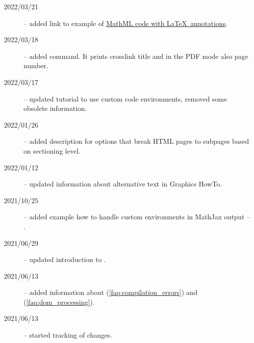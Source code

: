\begin{description}
  \item[2022/03/21] -- added link to example of \href{https://tex.stackexchange.com/a/637910/2891}{MathML code with \LaTeX\ annotations}.
  \item[2022/03/18] -- added \texcommand{\namerefpage} command. It prints crosslink title and in the PDF mode also page number.
  \item[2022/03/17] -- updated tutorial to use custom code environments, removed some obsolete information.
  \item[2022/01/26] -- added description for options that break HTML pages to subpages based on sectioning level.
  \item[2022/01/12] -- updated information about alternative text in Graphics HowTo.
  \item[2021/10/25] -- added example how to handle custom environments in MathJax output -- .
  \item[2021/06/29] -- updated introduction to .
  \item[2021/06/13] -- added information  about  (\ref{faq:compilation_errors}) and  (\ref{faq:dom_processing}).
  \item[2021/06/13] -- started tracking of changes.
\end{description}
